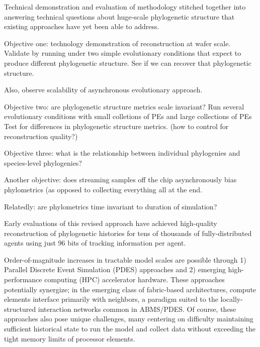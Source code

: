Technical demonstration and evaluation of methodology stitched together into answering technical questions about huge-scale phylogenetic structure that existing approaches have yet been able to address.

Objective one: technology demonstration of reconstruction at wafer scale.
Validate by running under two simple evolutionary conditions that expect to produce different phylogenetic structure.
See if we can recover that phylogenetic structure.

Also, observe scalability of asynchronous evolutionary approach.

Objective two: are phylogenetic structure metrics scale invariant?
Run several evolutionary conditions with small colletions of PEs and large collections of PEs
Test for differences in phylogenetic structure metrics.
(how to control for reconstruction quality?)

Objective three: what is the relationship between individual phylogenies and species-level phylogenies?

Another objective: does streaming samples off the chip asynchronously bias phylometrics (as opposed to collecting everything all at the end.

Relatedly: are phylometrics time invariant to duration of simulation?


Early evaluations of this revised approach have achieved high-quality reconstruction of phylogenetic histories for tens of thousands of fully-distributed agents using just 96 bits of tracking information per agent.


Order-of-magnitude increases in tractable model scales are possible through 1) Parallel Discrete Event Simulation (PDES) approaches and 2) emerging high-performance computing (HPC) accelerator hardware.
These approaches potentially synergize; in the emerging class of fabric-based architectures, compute elements interface primarily with neighbors, a paradigm suited to the locally-structured interaction networks common in ABMS/PDES.
Of course, these approaches also pose unique challenges, many centering on difficulty maintaining sufficient historical state to run the model and collect data without exceeding the tight memory limits of processor elements.

